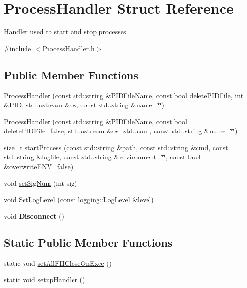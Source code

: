 \hypertarget{structProcessHandler}{}\section{Process\+Handler Struct Reference}
\label{structProcessHandler}


Handler used to start and stop processes.  




{\ttfamily \#include $<$Process\+Handler.\+h$>$}

\subsection*{Public Member Functions}
\begin{DoxyCompactItemize}
\item 
\hyperlink{structProcessHandler_a8b3e2bdfd035834b7f1f24448612634e}{Process\+Handler} (const std\+::string \&P\+I\+D\+File\+Name, const bool delete\+P\+I\+D\+File, int \&P\+ID, std\+::ostream \&os, const std\+::string \&name=\char`\"{}\char`\"{})
\item 
\hyperlink{structProcessHandler_a7eae2717540d1d2da5218998a00a44ec}{Process\+Handler} (const std\+::string \&P\+I\+D\+File\+Name, const bool delete\+P\+I\+D\+File=false, std\+::ostream \&os=std\+::cout, const std\+::string \&name=\char`\"{}\char`\"{})
\item 
size\+\_\+t \hyperlink{structProcessHandler_a9102d9895d68907414a97d4cd4ed79cc}{start\+Process} (const std\+::string \&path, const std\+::string \&cmd, const std\+::string \&logfile, const std\+::string \&environment=\char`\"{}\char`\"{}, const bool \&overwrite\+E\+NV=false)
\item 
void \hyperlink{structProcessHandler_a19a0020ef87b7e09c84c112a944016f6}{set\+Sig\+Num} (int sig)
\item 
void \hyperlink{structProcessHandler_a0db436c44ab9d066f8ad4f925d69ab45}{Set\+Log\+Level} (const logging\+::\+Log\+Level \&level)
\item 
void {\bfseries Disconnect} ()\hypertarget{structProcessHandler_ace0b788dd6e9dfcc29cb4ecb085e2b5e}{}\label{structProcessHandler_ace0b788dd6e9dfcc29cb4ecb085e2b5e}

\end{DoxyCompactItemize}
\subsection*{Static Public Member Functions}
\begin{DoxyCompactItemize}
\item 
static void \hyperlink{structProcessHandler_ab21685e016fc2f3365665640261e939c}{set\+All\+F\+H\+Close\+On\+Exec} ()
\item 
static void \hyperlink{structProcessHandler_a4eb6afb25ee59bf5e015c465b71c40c2}{setup\+Handler} ()
\end{DoxyCompactItemize}


